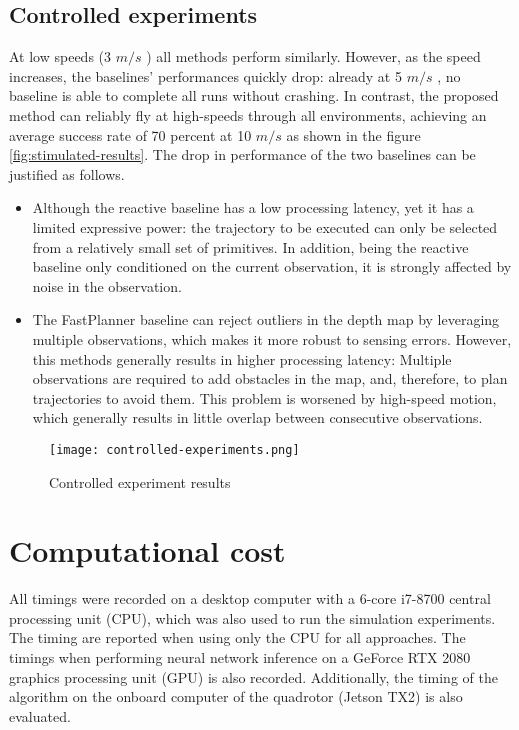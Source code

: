 \subsection{Controlled experiments}
At
low speeds (3 $m/s$ ) all methods perform similarly. However, as the
speed increases, the baselines’ performances quickly drop: already at
5 $m/s$ , no baseline is able to complete all runs without crashing. In
contrast, the proposed method can reliably fly at high-speeds through all environments, achieving an average success rate of 70 percent at 10 $m/s$ as shown in the figure \ref{fig:stimulated-results}. The
drop in performance of the two baselines can be justified as follows.
\begin{itemize}
	\item Although the reactive \cite{reactive_method} baseline has a low processing latency, yet it has a limited expressive power: the trajectory to be executed can only be selected from a relatively small set of primitives. In addition, being the reactive \cite{reactive_method} baseline only conditioned on the current observation, it is strongly affected by noise in the observation.
	\item The FastPlanner \cite{fastPlanner} baseline can reject outliers in the depth map by leveraging multiple observations, which makes it more robust to sensing errors. However, this methods generally results in higher processing latency: Multiple observations are required to add
obstacles in the map, and, therefore, to plan trajectories to avoid them.
This problem is worsened by high-speed motion, which generally results in little overlap between consecutive observations.
\end{itemize}

\begin{figure}[!h]
	\texttt{[image: controlled-experiments.png]}
	\caption{Controlled experiment results}
	\label{fig:stimulated_results}
\end{figure}


\section{Computational cost}

All timings were recorded on a desktop computer
with a 6-core i7-8700 central processing unit (CPU), which was also
used to run the simulation experiments. The timing are reported when using only the CPU for all approaches.
The timings when performing neural network inference on a GeForce RTX 2080 graphics processing unit
(GPU) is also recorded. Additionally, the timing of the algorithm on the onboard computer of the
quadrotor (Jetson TX2) is also evaluated.

